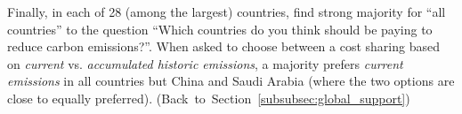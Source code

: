 Finally, in each of 28 (among the largest) countries, \citet{dabla-norris_public_2023} find strong majority for ``all countries'' to the question ``Which countries do you think should be paying to reduce carbon emissions?''. When asked to choose between a cost sharing based on \textit{current} vs. \textit{accumulated historic emissions}, a majority prefers \textit{current emissions} in all countries but China and Saudi Arabia (where the two options are close to equally preferred). \hfill (Back~to~Section~\ref{subsubsec:global_support}) %


